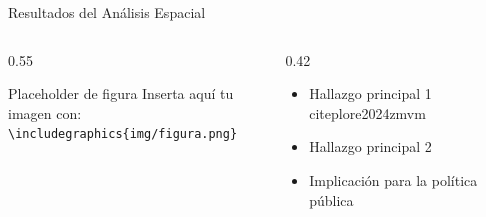\begin{frame}{Resultados del Análisis Espacial}
  \begin{columns}[T]
    \begin{column}{0.55\textwidth}

      \begin{alertblock}{Placeholder de figura}
        Inserta aquí tu imagen con:\\
        \texttt{\textbackslash includegraphics\{img/figura.png\}}
      \end{alertblock}
    \end{column}
    \begin{column}{0.42\textwidth}
      \begin{itemize}
        \item Hallazgo principal 1 citep{lore2024zmvm}
        \item Hallazgo principal 2
        \item Implicación para la política pública
      \end{itemize}
    \end{column}
  \end{columns}
\end{frame}

